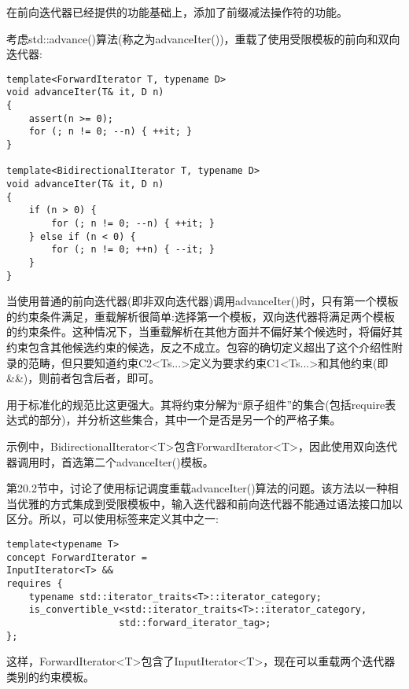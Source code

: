 在前向迭代器已经提供的功能基础上，添加了前缀减法操作符的功能。

考虑std::advance()算法(称之为advanceIter())，重载了使用受限模板的前向和双向迭代器:

\begin{lstlisting}[style=styleCXX]
template<ForwardIterator T, typename D>
void advanceIter(T& it, D n)
{
	assert(n >= 0);
	for (; n != 0; --n) { ++it; }
}

template<BidirectionalIterator T, typename D>
void advanceIter(T& it, D n)
{
	if (n > 0) {
		for (; n != 0; --n) { ++it; }
	} else if (n < 0) {
		for (; n != 0; ++n) { --it; }
	}
}
\end{lstlisting}

当使用普通的前向迭代器(即非双向迭代器)调用advanceIter()时，只有第一个模板的约束条件满足，重载解析很简单:选择第一个模板，双向迭代器将满足两个模板的约束条件。这种情况下，当重载解析在其他方面并不偏好某个候选时，将偏好其约束包含其他候选约束的候选，反之不成立。包容的确切定义超出了这个介绍性附录的范畴，但只要知道约束C2<Ts...>定义为要求约束C1<Ts...>和其他约束(即\&\&)，则前者包含后者，即可。

\begin{tcolorbox}[colback=webgreen!5!white,colframe=webgreen!75!black]
\hspace*{0.75cm}用于标准化的规范比这更强大。其将约束分解为“原子组件”的集合(包括require表达式的部分)，并分析这些集合，其中一个是否是另一个的严格子集。
\end{tcolorbox}

示例中，BidirectionalIterator<T>包含ForwardIterator<T>，因此使用双向迭代器调用时，首选第二个advanceIter()模板。


第20.2节中，讨论了使用标记调度重载advanceIter()算法的问题。该方法以一种相当优雅的方式集成到受限模板中，输入迭代器和前向迭代器不能通过语法接口加以区分。所以，可以使用标签来定义其中之一:

\begin{lstlisting}[style=styleCXX]
template<typename T>
concept ForwardIterator =
InputIterator<T> &&
requires {
	typename std::iterator_traits<T>::iterator_category;
	is_convertible_v<std::iterator_traits<T>::iterator_category,
					std::forward_iterator_tag>;
};
\end{lstlisting}

这样，ForwardIterator<T>包含了InputIterator<T>，现在可以重载两个迭代器类别的约束模板。





















